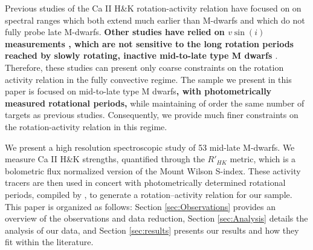 Previous studies of the Ca II H\&K rotation-activity relation
\citep[e.g.][]{Vau81, Sua15, Def17, Hou17} have focused on on spectral ranges
which both extend much earlier than M-dwarfs and which do not fully probe late
M-dwarfs. \textbf{Other studies have relied on $v\sin(i)$ measurements
\citep[e.g.][]{Browning2010, Hou17}, which are not sensitive to the long
rotation periods reached by slowly rotating, inactive mid-to-late type M dwarfs
\citep[70-150 days:][]{Newton2016}}. Therefore, these studies can present only
coarse constraints on the rotation activity relation in the fully convective
regime. The sample we present in this paper is focused on mid-to-late type M
dwarfs\textbf{, with photometrically measured rotational periods,} while maintaining of
order the same number of targets as previous studies.  Consequently, we provide
much finer constraints on the rotation-activity relation in this regime. 



We present a high resolution spectroscopic study of 53 mid-late M-dwarfs. We
measure Ca II H\&K strengths, quantified through the $R'_{HK}$ metric, which is
a bolometric flux normalized version of the Mount Wilson S-index. These
activity tracers are then used in concert with photometrically determined
rotational periods, compiled by \citet{Newton2017}, to generate a
rotation--activity relation for our sample. This paper is organized as follows:
Section \ref{sec:Observations} provides an overview of the observations and
data reduction, Section \ref{sec:Analysis} details the analysis of our data,
and Section \ref{sec:results} presents our results and how they fit within the
literature. 
